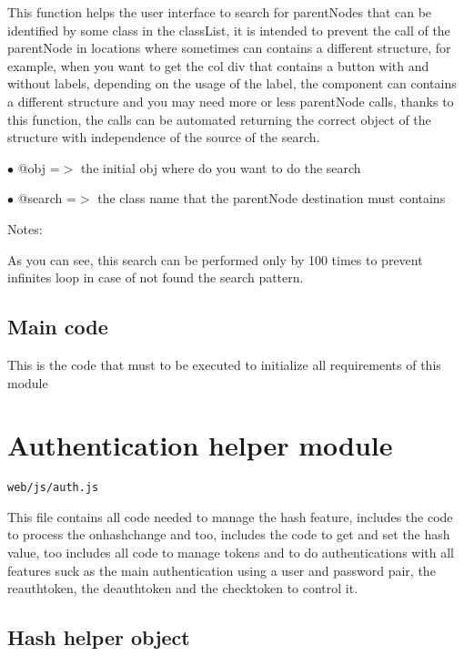 \documentclass[a4paper]{book}
\begin{document}
This function helps the user interface to search for parentNodes that can be identified
by some class in the classList, it is intended to prevent the call of the parentNode in
locations where sometimes can contains a different structure, for example, when you want
to get the col div that contains a button with and without labels, depending on the
usage of the label, the component can contains a different structure and you may need
more or less parentNode calls, thanks to this function, the calls can be automated
returning the correct object of the structure with independence of the source of the
search.

\begin{compactitem}
\item[\color{myblue}$\bullet$] @obj    =$>$ the initial obj where do you want to do the search
\item[\color{myblue}$\bullet$] @search =$>$ the class name that the parentNode destination must contains
\end{compactitem}

Notes:

As you can see, this search can be performed only by 100 times to prevent infinites loop
in case of not found the search pattern.

\hypertarget{toc396}{}
\subsection{Main code}

This is the code that must to be executed to initialize all requirements of this module

\hypertarget{toc397}{}
\section{Authentication helper module}

\begin{lstlisting}
web/js/auth.js
\end{lstlisting}

This file contains all code needed to manage the hash feature, includes the code to
process the onhashchange and too, includes the code to get and set the hash value, too
includes all code to manage tokens and to do authentications with all features suck as
the main authentication using a user and password pair, the reauthtoken, the deauthtoken
and the checktoken to control it.

\hypertarget{toc398}{}
\subsection{Hash helper object}
\end{document}
